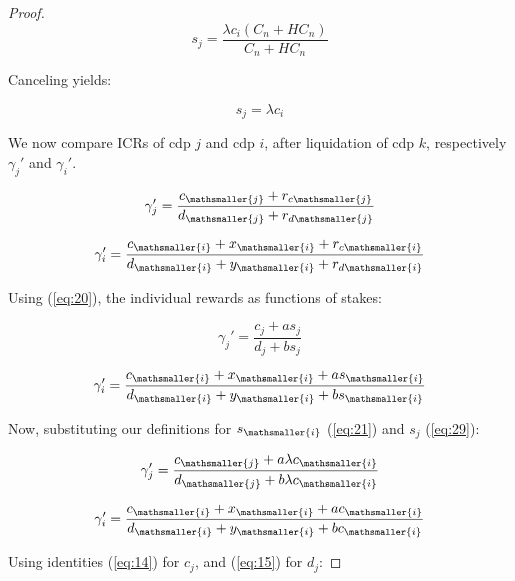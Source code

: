 \documentclass[reqno]{article}
\begin{document}
\begin{proof}
\begin{equation} 
    s_j=\frac{\lambda c_i(C_n+HC_n)}{C_n+HC_n}
\end{equation}

\bigskip
Canceling yields:

\begin{equation} \label{eq:29}
    s_j=\lambda c_i
\end{equation}

\bigskip
We now compare ICRs of cdp $j$ and cdp $i$, after liquidation of cdp $k$, respectively $\gamma_{j}'$ and $\gamma_{i}'$.

\begin{equation} 
    \gamma_{j}'=\frac{c_\mathsmaller{j}+r_{c\mathsmaller{j}}}{d_\mathsmaller{j}+r_{d\mathsmaller{j}}}
\end{equation}

\begin{equation} 
    \gamma_{i}'=\frac{c_\mathsmaller{i}+x_\mathsmaller{i}+r_{c\mathsmaller{i}}}{d_\mathsmaller{i}+y_\mathsmaller{i}+r_{d\mathsmaller{i}}}
\end{equation}

\bigskip
Using (\ref{eq:20}), the individual rewards as functions of stakes:

\begin{equation} 
    \gamma_{j}'=\frac{c_j+as_j}{d_j+bs_j}
\end{equation}

\begin{equation} 
    \gamma_{i}'=\frac{c_\mathsmaller{i}+x_\mathsmaller{i}+as_\mathsmaller{i}}{d_\mathsmaller{i}+y_\mathsmaller{i}+bs_\mathsmaller{i}}
\end{equation}

\bigskip
Now, substituting our definitions for $s_\mathsmaller{i}$ (\ref{eq:21}) and $s_j$ (\ref{eq:29}):

\begin{equation} 
    \gamma_{j}'=\frac{c_\mathsmaller{j}+a\lambda c_\mathsmaller{i}}{d_\mathsmaller{j}+b\lambda c_\mathsmaller{i}}
\end{equation}

\begin{equation} 
    \gamma_{i}'=\frac{c_\mathsmaller{i}+x_\mathsmaller{i}+ac_\mathsmaller{i}}{d_\mathsmaller{i}+y_\mathsmaller{i}+bc_\mathsmaller{i}}
\end{equation}

\bigskip
Using identities (\ref{eq:14}) for $c_j$, and (\ref{eq:15}) for $d_j$:


\end{proof}
\end{document}
